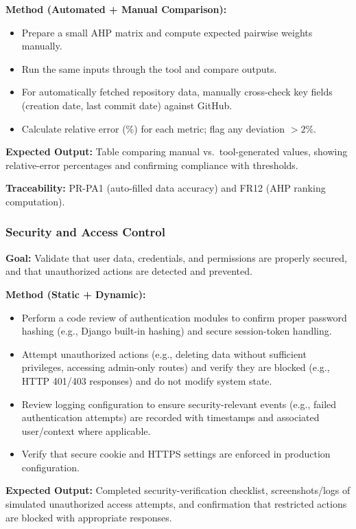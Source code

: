 \documentclass[12pt, titlepage]{article}
\begin{document}
\textbf{Method (Automated + Manual Comparison):}
\begin{itemize}
  \item Prepare a small AHP matrix and compute expected pairwise weights manually.
  \item Run the same inputs through the tool and compare outputs.
  \item For automatically fetched repository data, manually cross-check key fields (creation date, last commit date) against GitHub.
  \item Calculate relative error (\%) for each metric; flag any deviation \(> 2\%\).
\end{itemize}

\textbf{Expected Output:} Table comparing manual vs.\ tool-generated values, showing relative-error percentages and confirming compliance with thresholds.

\textbf{Traceability:} PR-PA1 (auto-filled data accuracy) and FR12 (AHP ranking computation).

\subsubsection{Security and Access Control}
\label{subsubsec:security}

\textbf{Goal:} Validate that user data, credentials, and permissions are properly secured, and that unauthorized actions are detected and prevented.

\textbf{Method (Static + Dynamic):}
\begin{itemize}
  \item Perform a code review of authentication modules to confirm proper password hashing (e.g., Django built-in hashing) and secure session-token handling.
  \item Attempt unauthorized actions (e.g., deleting data without sufficient privileges, accessing admin-only routes) and verify they are blocked (e.g., HTTP 401/403 responses) and do not modify system state.
  \item Review logging configuration to ensure security-relevant events (e.g., failed authentication attempts) are recorded with timestamps and associated user/context where applicable.
  \item Verify that secure cookie and HTTPS settings are enforced in production configuration.
\end{itemize}

\textbf{Expected Output:} Completed security-verification checklist, screenshots/logs of simulated unauthorized access attempts, and confirmation that restricted actions are blocked with appropriate responses.
\end{document}
